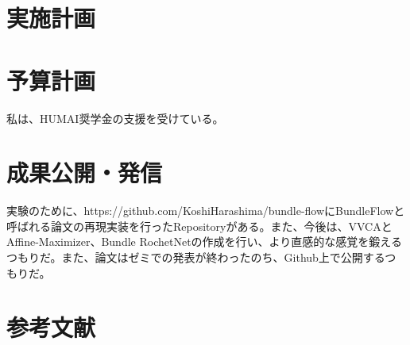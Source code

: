\documentclass[dvipdfmx,autodetect-engine]{article}
\begin{document}
\section*{実施計画}

\section*{予算計画}
私は、HUMAI奨学金の支援を受けている。

\section*{成果公開・発信}
実験のために、https://github.com/KoshiHarashima/bundle-flowにBundleFlowと呼ばれる論文の再現実装を行ったRepositoryがある。また、今後は、VVCAとAffine-Maximizer、Bundle RochetNetの作成を行い、より直感的な感覚を鍛えるつもりだ。また、論文はゼミでの発表が終わったのち、Github上で公開するつもりだ。

\section*{参考文献}


\nocite{*}
\printbibliography
\end{document}
